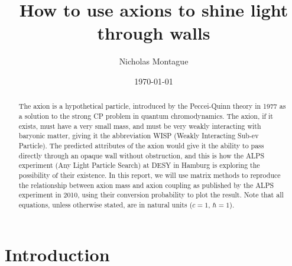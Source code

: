 \documentclass[12pt]{article}
\title{How to use axions to shine light through walls}
\author{Nicholas Montague}
\date{\today}
\begin{document}
\maketitle

\begin{abstract}
The axion is a hypothetical particle, introduced by the Peccei-Quinn theory in 1977 as a solution to the strong CP problem in quantum chromodynamics. The axion, if it exists, must have a very small mass, and must be very weakly interacting with baryonic matter, giving it the abbreviation WISP (Weakly Interacting Sub-ev Particle). The predicted attributes of the axion would give it the ability to pass directly through an opaque wall without obstruction, and this is how the ALPS experiment (Any Light Particle Search) at DESY in Hamburg is exploring the possibility of their existence. In this report, we will use matrix methods to reproduce the relationship between axion mass and axion coupling as published by the ALPS experiment \autocite{Ehret, K. et al (2010). New ALPS results on hidden-sector lightweights} in 2010, using their conversion probability to plot the result. Note that all equations, unless otherwise stated, are in natural units ($c=1$, $\hbar = 1$).
\end{abstract}

\section{Introduction}
\end{document}
